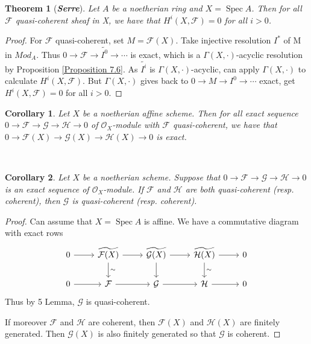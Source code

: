 \documentclass{ctexart}
\newtheorem{theorem}{Theorem}[section]
\newtheorem{corollary}{Corollary}[section]
\newcommand{\spec}{\operatorname{Spec}}
\begin{document}
\begin{theorem}[\textbf{\emph{Serre}}]
    Let $A$ be a noetherian ring and $X = \spec A$.
    Then for all $\mathcal{F}$ quasi-coherent sheaf in X, we have that $H^{i}(X, \mathcal{F}) = 0$ for all $i > 0$.
    \label{Theorem 7.3}
\end{theorem}
\begin{proof}
    For $\mathcal{F}$ quasi-coherent, set $M = \mathcal{F}(X)$.
    Take injective resolution $I^{\ast}$ of M in $Mod_{A}$.
    Thus $0 \longrightarrow \mathcal{F} \longrightarrow \widetilde{I^{0}} \longrightarrow \cdots$ is exact, which is a $\Gamma(X, \cdot)$-acyclic resolution by Proposition \ref{Proposition 7.6}.
    As $\widetilde{I^{i}}$ is $\Gamma(X, \cdot)$-acyclic, can apply $\Gamma(X, \cdot)$ to calculate $H^{i}(X, \mathcal{F})$.
    But $\Gamma(X, \cdot)$ gives back to $0 \longrightarrow M \longrightarrow I^{0} \longrightarrow \cdots$ exact, get $H^{i}(X, \mathcal{F}) = 0$ for all $i > 0$. 
\end{proof}
\begin{corollary}
    Let $X$ be a noetherian affine scheme.
    Then for all exact sequence $0 \longrightarrow \mathcal{F} \longrightarrow \mathcal{G} \longrightarrow \mathcal{H} \longrightarrow 0$ of $\mathcal{O}_{X}$-module with $\mathcal{F}$ quasi-coherent,
    we have that $0 \longrightarrow \mathcal{F}(X) \longrightarrow \mathcal{G}(X) \longrightarrow \mathcal{H}(X) \longrightarrow 0$ is exact.
    \label{Corollary 7.4}
\end{corollary}\
\begin{corollary}
    Let $X$ be a noetherian scheme.
    Suppose that $0 \longrightarrow \mathcal{F} \longrightarrow \mathcal{G} \longrightarrow \mathcal{H} \longrightarrow 0$ is an exact sequence of $\mathcal{O}_{X}$-module.
    If $\mathcal{F}$ and $\mathcal{H}$ are both quasi-coherent (resp. coherent), then $\mathcal{G}$ is quasi-coherent (resp. coherent).
    \label{Corollary 7.5} 
\end{corollary}
\begin{proof}
    Can assume that $X = \spec A$ is affine.
    We have a commutative diagram with exact rows
    \begin{equation*}
        \begin{tikzcd}
            0 \arrow[r] &
            \widetilde{\mathcal{F}(X)} \arrow[r] \arrow[d, "\sim"] &
            \widetilde{\mathcal{G}(X)} \arrow[r] \arrow[d] &
            \widetilde{\mathcal{H}(X)} \arrow[r] \arrow[d, "\sim"] & 
            0 \\
            0 \arrow[r] &
            \mathcal{F} \arrow[r] &
            \mathcal{G} \arrow[r] &
            \mathcal{H} \arrow[r] & 
            0
        \end{tikzcd}
    \end{equation*}
    Thus by 5 Lemma, $\mathcal{G}$ is quasi-coherent.
    \par
    If moreover $\mathcal{F}$ and $\mathcal{H}$ are coherent, then $\mathcal{F}(X)$ and $\mathcal{H}(X)$ are finitely generated.
    Then $\mathcal{G}(X)$ is also finitely generated so that $\mathcal{G}$ is coherent.
\end{proof}
\end{document}
